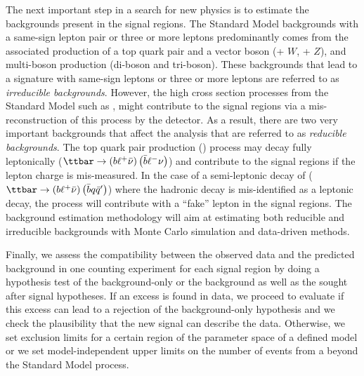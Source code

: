 The next important step in a search for new physics is to estimate the 
backgrounds present in the signal regions.
The Standard Model backgrounds with a same-sign lepton pair or three or more 
leptons predominantly comes
from the associated production of a top quark pair and a vector boson (\ttbar + $W$, \ttbar + $Z$), and multi-boson production (di-boson and tri-boson). 
These backgrounds that lead to a signature with same-sign leptons or three 
or more leptons are referred to as \textit{irreducible backgrounds}.
However, the high cross section processes from the Standard Model such as \ttbar, might contribute to the signal regions via a mis-reconstruction of this 
process by the detector. As a result, there are two very important backgrounds
 that affect the analysis that are referred to as 
\textit{reducible backgrounds}.
The top quark pair production (\ttbar) process may decay fully leptonically 
($\ttbar \to \left(b\ell^+\bar{\nu}\right)\left(\bar{b}\ell^{-}\nu\right)$) 
and contribute to the signal regions if the lepton charge is mis-measured.
In the case of a semi-leptonic decay of \ttbar 
($\ttbar \to \left(b\ell^+\bar{\nu}\right)\left(\bar{b}q \bar{q}'\right)$)
where the hadronic decay is mis-identified as a leptonic decay, 
the process will contribute with a ``fake'' lepton in the signal regions.
The background estimation methodology will aim at estimating both 
reducible and irreducible backgrounds with Monte Carlo simulation and 
data-driven methods.

Finally, we assess the compatibility between the observed data and the 
predicted background in one counting experiment for each signal region 
by doing a hypothesis test
of the background-only or the background as well as the sought 
after signal hypotheses.
If an excess is found in data, we proceed to evaluate if this excess can lead
to a rejection of the background-only hypothesis and we check the plausibility that 
the new signal can describe the data.
Otherwise, we set exclusion limits for a certain region of the parameter 
space of a defined model or we set model-independent upper limits on the number 
of events from a beyond the Standard Model process. 
